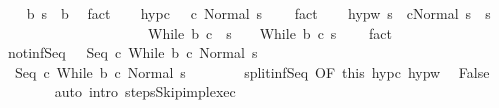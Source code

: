 \begin{isabellebody}
\ \ \isamarkupfalse%
\ b{\isacharcolon}\ {\isachardoublequoteopen}s\ {\isasymin}\ b{\isachardoublequoteclose}\ \isamarkupfalse%
\ fact\isanewline
\ \ \isamarkupfalse%
\ hyp{\isacharunderscore}c{\isacharcolon}\ {\isachardoublequoteopen}{\isasymnot}\ {\isasymGamma}{\isasymturnstile}\ {\isacharparenleft}c{\isacharcomma}\ Normal\ s{\isacharparenright}\ {\isasymrightarrow}\ {\isasymdots}{\isacharparenleft}{\isasyminfinity}{\isacharparenright}{\isachardoublequoteclose}\ \isamarkupfalse%
\ fact\isanewline
\ \ \isamarkupfalse%
\ hyp{\isacharunderscore}w{\isacharcolon}\ {\isachardoublequoteopen}{\isasymforall}s{\isacharprime}{\isachardot}\ {\isasymGamma}{\isasymturnstile}\ {\isasymlangle}c{\isacharcomma}Normal\ s{\isasymrangle}\ {\isasymRightarrow}\ s{\isacharprime}\ {\isasymlongrightarrow}\ \isanewline
\ \ \ \ \ \ \ \ \ \ \ \ \ \ \ \ \ \ \ \ \ {\isasymGamma}{\isasymturnstile}While\ b\ c\ {\isasymdown}\ s{\isacharprime}\ {\isasymand}\ {\isasymnot}\ {\isasymGamma}{\isasymturnstile}\ {\isacharparenleft}While\ b\ c{\isacharcomma}\ s{\isacharprime}{\isacharparenright}\ {\isasymrightarrow}\ {\isasymdots}{\isacharparenleft}{\isasyminfinity}{\isacharparenright}{\isachardoublequoteclose}\ \isamarkupfalse%
\ fact\isanewline
\ \ \isamarkupfalse%
\ not{\isacharunderscore}inf{\isacharunderscore}Seq{\isacharcolon}\ {\isachardoublequoteopen}{\isasymnot}\ {\isasymGamma}{\isasymturnstile}\ {\isacharparenleft}Seq\ c\ {\isacharparenleft}While\ b\ c{\isacharparenright}{\isacharcomma}\ Normal\ s{\isacharparenright}\ {\isasymrightarrow}\ {\isasymdots}{\isacharparenleft}{\isasyminfinity}{\isacharparenright}{\isachardoublequoteclose}\isanewline
\ \ \isamarkupfalse%
\ \isanewline
\ \ \ \ \isamarkupfalse%
\ {\isachardoublequoteopen}{\isasymGamma}{\isasymturnstile}\ {\isacharparenleft}Seq\ c\ {\isacharparenleft}While\ b\ c{\isacharparenright}{\isacharcomma}\ Normal\ s{\isacharparenright}\ {\isasymrightarrow}\ {\isasymdots}{\isacharparenleft}{\isasyminfinity}{\isacharparenright}{\isachardoublequoteclose}\isanewline
\ \ \ \ \isamarkupfalse%
\ split{\isacharunderscore}inf{\isacharunderscore}Seq\ {\isacharbrackleft}OF\ this{\isacharbrackright}\ hyp{\isacharunderscore}c\ hyp{\isacharunderscore}w\ \isamarkupfalse%
\ False\isanewline
\ \ \ \ \ \ \isamarkupfalse%
\ {\isacharparenleft}auto\ intro{\isacharcolon}\ steps{\isacharunderscore}Skip{\isacharunderscore}impl{\isacharunderscore}exec{\isacharparenright}\isanewline

\end{isabellebody}
